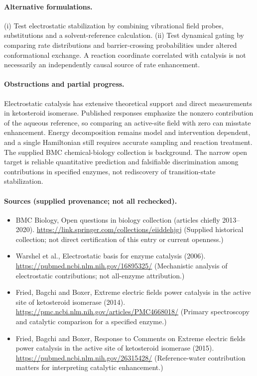 \documentclass[11pt]{article}
\begin{document}
\paragraph{Alternative formulations.} (i) Test electrostatic stabilization by combining vibrational field probes, substitutions and a solvent-reference calculation. (ii) Test dynamical gating by comparing rate distributions and barrier-crossing probabilities under altered conformational exchange. A reaction coordinate correlated with catalysis is not necessarily an independently causal source of rate enhancement.
\paragraph{Obstructions and partial progress.} Electrostatic catalysis has extensive theoretical support and direct measurements in ketosteroid isomerase. Published responses emphasize the nonzero contribution of the aqueous reference, so comparing an active-site field with zero can misstate enhancement. Energy decomposition remains model and intervention dependent, and a single Hamiltonian still requires accurate sampling and reaction treatment. The supplied BMC chemical-biology collection is background. The narrow open target is reliable quantitative prediction and falsifiable discrimination among contributions in specified enzymes, not rediscovery of transition-state stabilization.
\paragraph{Sources (supplied provenance; not all rechecked).}
\begin{itemize}
\item BMC Biology, Open questions in biology collection (articles chiefly 2013--2020). \url{https://link.springer.com/collections/eiiddehjgj} (Supplied historical collection; not direct certification of this entry or current openness.)
\item Warshel et al., Electrostatic basis for enzyme catalysis (2006). \url{https://pubmed.ncbi.nlm.nih.gov/16895325/} (Mechanistic analysis of electrostatic contributions; not all-enzyme attribution.)
\item Fried, Bagchi and Boxer, Extreme electric fields power catalysis in the active site of ketosteroid isomerase (2014). \url{https://pmc.ncbi.nlm.nih.gov/articles/PMC4668018/} (Primary spectroscopy and catalytic comparison for a specified enzyme.)
\item Fried, Bagchi and Boxer, Response to Comments on Extreme electric fields power catalysis in the active site of ketosteroid isomerase (2015). \url{https://pubmed.ncbi.nlm.nih.gov/26315428/} (Reference-water contribution matters for interpreting catalytic enhancement.)
\end{itemize}
\end{document}
